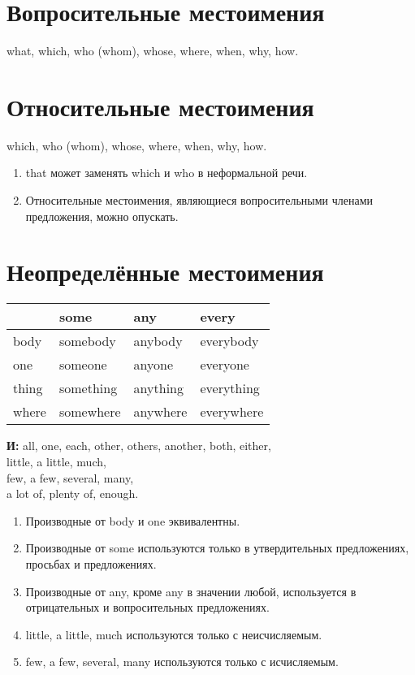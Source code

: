 \documentclass[oneside]{book}
\begin{document}
\section{Вопросительные местоимения}
what, which, who (whom), whose,
where, when, why, how.

\section{Относительные местоимения}
which, who (whom), whose,
where, when, why, how.

\begin{enumerate}
    \item that может заменять which и who
    в неформальной речи.

    \item Относительные местоимения,
    являющиеся вопросительными членами
    предложения, можно опускать.
\end{enumerate}

\section{Неопределённые местоимения}
\begin{center}
    \begin{tabular}{|l|l|l|l|}
    \hline
          & some      & any      & every      \\ \hline
    body  & somebody  & anybody  & everybody  \\ \hline
    one   & someone   & anyone   & everyone   \\ \hline
    thing & something & anything & everything \\ \hline
    where & somewhere & anywhere & everywhere \\ \hline
    \end{tabular}
\end{center}

\textbf{И:} all, one, each, other, others, another,
both, either,
\\
little, a little, much,
\\
few, a few, several, many,
\\
a lot of, plenty of, enough.

\begin{enumerate}
    \item Производные от body и one эквивалентны.

    \item Производные от some используются только в
    утвердительных предложениях, \\
    просьбах и предложениях.

    \item Производные от any, кроме any в значении
    любой, используется в отрицательных
    и вопросительных предложениях.

    \item little, a little, much используются только
    с неисчисляемым.

    \item few, a few, several, many используются
    только с исчисляемым.
\end{enumerate}
\end{document}
